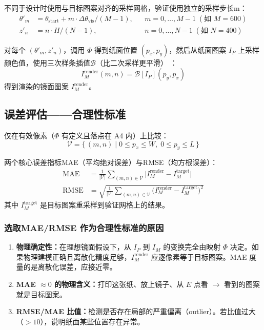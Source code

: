 \documentclass[12pt,a4paper]{ctexart}
\begin{document}
不同于设计时使用与目标图案对齐的采样网格，验证使用独立的采样步长m：
\begin{align}
    \theta'_m &= \theta_{\mathrm{start}} + m\cdot\Delta\theta_{\mathrm{vis}}/(M-1), && m=0,\dots,M-1\;(\text{如 }M=600) \label{eq:verify_theta}\\
    z'_n     &= n\cdot H/(N-1), && n=0,\dots,N-1\;(\text{如 }N=400) \label{eq:verify_z}
\end{align}

对每个 $(\theta'_m, z'_n)$，调用 $\Phi$ 得到纸面位置 $(p_x, p_y)$，然后从纸面图案 $I_P$ 上采样颜色值，使用三次样条插值$\mathcal{B}$（比二次采样更平滑） ：
\begin{equation}
    I_M^{\mathrm{render}}(m,n) = \mathcal{B}[I_P](p_y, p_x)
\end{equation}
得到渲染的镜面图案 $I_M^{\mathrm{render}}$。

\subsection{误差评估——合理性标准}

仅在有效像素（$\Phi$ 有定义且落点在 A4 内）上比较：
\begin{equation}
    \mathcal{V} = \{\, (m,n) \mid 0\le p_x\le W,\; 0\le p_y\le L \,\}
\end{equation}

两个核心误差指标MAE（平均绝对误差）与RMSE（均方根误差）：
\begin{align}
    \mathrm{MAE}  &= \frac{1}{|\mathcal{V}|} \sum_{(m,n)\in\mathcal{V}} \bigl| I_M^{\mathrm{render}} - I_M^{\mathrm{target}} \bigr| \label{eq:mae}\\[4pt]
    \mathrm{RMSE} &= \sqrt{\frac{1}{|\mathcal{V}|} \sum_{(m,n)\in\mathcal{V}} \bigl( I_M^{\mathrm{render}} - I_M^{\mathrm{target}} \bigr)^2} \label{eq:rmse}
\end{align}
其中 $I_M^{\mathrm{target}}$ 是目标图案重采样到验证网格上的结果。

\subsubsection*{选取MAE/RMSE 作为合理性标准的原因}

\begin{enumerate}[label=(\arabic*)]
    \item \textbf{物理确定性：}在理想镜面假设下，从 $I_P$ 到 $I_M$ 的变换完全由映射 $\Phi$ 决定。如果物理建模正确且离散化精度足够，$I_M^{\mathrm{render}}$ 应逐像素等于目标图案。MAE 度量的是离散化误差，应接近零。
    \item \textbf{MAE $\approx 0$ 的物理含义：}打印这张纸、放上镜子、从 $E$ 点看 $\to$ 看到的图案就是目标图案。
    \item \textbf{RMSE/MAE 比值：}检测是否存在局部的严重偏离（outlier）。若比值过大（$>10$），说明纸面某些位置存在异常。
\end{enumerate}
\end{document}
